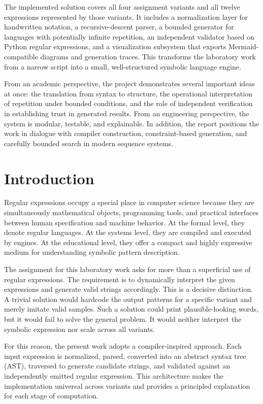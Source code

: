\documentclass[a4paper,12pt]{article}
\begin{document}
The implemented solution covers all four assignment variants and all twelve expressions represented by those variants. It includes a normalization layer for handwritten notation, a recursive-descent parser, a bounded generator for languages with potentially infinite repetition, an independent validator based on Python regular expressions, and a visualization subsystem that exports Mermaid-compatible diagrams and generation traces. This transforms the laboratory work from a narrow script into a small, well-structured symbolic language engine.

From an academic perspective, the project demonstrates several important ideas at once: the translation from syntax to structure, the operational interpretation of repetition under bounded conditions, and the role of independent verification in establishing trust in generated results. From an engineering perspective, the system is modular, testable, and explainable. In addition, the report positions the work in dialogue with compiler construction, constraint-based generation, and carefully bounded search in modern sequence systems.

\section{Introduction}

Regular expressions occupy a special place in computer science because they are simultaneously mathematical objects, programming tools, and practical interfaces between human specification and machine behavior. At the formal level, they denote regular languages. At the systems level, they are compiled and executed by engines. At the educational level, they offer a compact and highly expressive medium for understanding symbolic pattern description.

The assignment for this laboratory work asks for more than a superficial use of regular expressions. The requirement is to dynamically interpret the given expressions and generate valid strings accordingly. This is a decisive distinction. A trivial solution would hardcode the output patterns for a specific variant and merely imitate valid samples. Such a solution could print plausible-looking words, but it would fail to solve the general problem. It would neither interpret the symbolic expression nor scale across all variants.

For this reason, the present work adopts a compiler-inspired approach. Each input expression is normalized, parsed, converted into an abstract syntax tree (AST), traversed to generate candidate strings, and validated against an independently emitted regular expression. This architecture makes the implementation universal across variants and provides a principled explanation for each stage of computation.
\end{document}

